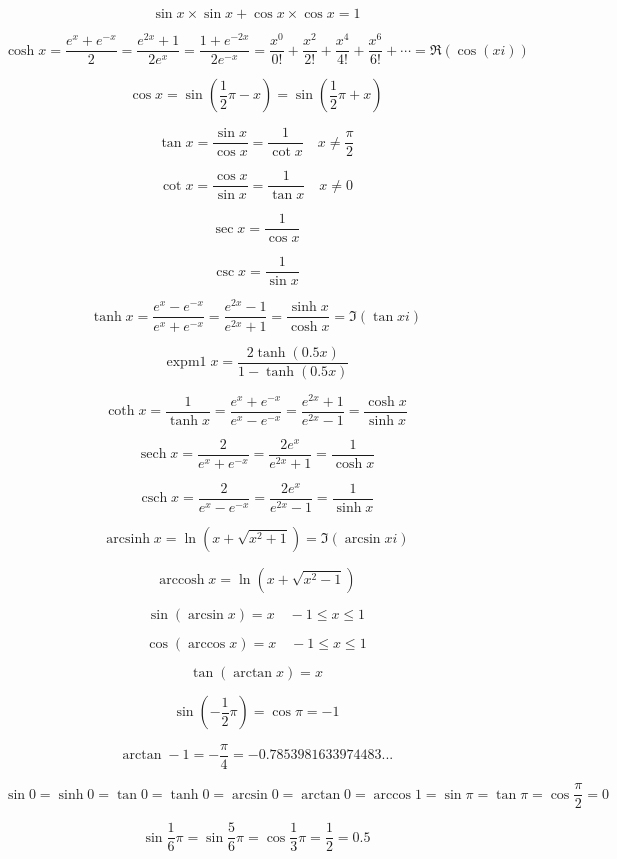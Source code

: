 \documentclass{article}
\DeclareMathOperator{\csch}{csch}
\DeclareMathOperator{\sech}{sech}
\DeclareMathOperator{\arcsinh}{arcsinh}
\DeclareMathOperator{\arccosh}{arccosh}
\DeclareMathOperator{\expmone}{expm1}
\begin{document}
$$\sin x\times\sin x + \cos x\times\cos x = 1$$

$$\cosh x = \frac{e^x + e^{-x}}{2} = \frac{e^{2x} + 1}{2e^x} = \frac{1 + e^{-2x}}{2e^{-x}} =
\frac{x^0}{0!} + \frac{x^2}{2!} + \frac{x^4}{4!} + \frac{x^6}{6!} + \cdots=\Re(\cos(xi))$$

$$\cos x = \sin(\frac{1}{2}\pi - x) = \sin(\frac{1}{2}\pi + x)$$

$$\tan x = \frac{\sin x}{\cos x} = \frac{1}{\cot x}
\quad x \neq\frac{\pi}{2}$$

$$\cot x = \frac{\cos x}{\sin x} = \frac{1}{\tan x} \quad x \neq 0$$

$$\sec x = \frac{1}{\cos x}$$

$$\csc x = \frac{1}{\sin x}$$

$$\tanh x = \frac{e^x-e^{-x}}{e^x+e^{-x}} =
\frac{e^{2x}-1}{e^{2x}+1} = \frac{\sinh x}{\cosh x} =
\Im(\tan xi)$$

$$\expmone x = \frac{2\tanh(0.5x)}{1-\tanh(0.5x)}$$

$$\coth x = \frac{1}{\tanh x} = \frac{e^x + e^{-x}}{e^x - e^{-x}} =
\frac{e^{2x} + 1}{e^{2x} - 1} = \frac{\cosh x}{\sinh x}$$

$$\sech x = \frac{2}{e^x + e^{-x}} = \frac{2e^x}{e^{2x}+1} = \frac{1}{\cosh x}$$

$$\csch x = \frac{2}{e^x - e^{-x}} = \frac{2e^x}{e^{2x}-1} = \frac{1}{\sinh x}$$

$$\arcsinh x = \ln(x+\sqrt{x^2+1}) = \Im(\arcsin xi)$$

$$\arccosh x = \ln(x+\sqrt{x^2-1})$$

$$\sin(\arcsin x) = x \quad -1 \leq x \leq 1$$

$$\cos(\arccos x) = x \quad -1 \leq x \leq 1$$

$$\tan(\arctan x) = x$$

$$\sin(-\frac{1}{2}\pi) = \cos\pi = -1$$

$$\arctan-1 = -\frac{\pi}{4} = -0.7853981633974483...$$

$$\sin0 = \sinh0 = \tan0 = \tanh0 = \arcsin0 = \arctan0 = \arccos1 = \sin\pi =
\tan\pi = \cos\frac{\pi}{2} = 0$$

$$\sin\frac{1}{6}\pi = \sin\frac{5}{6}\pi = \cos\frac{1}{3}\pi = \frac{1}{2} = 0.5$$
\end{document}
